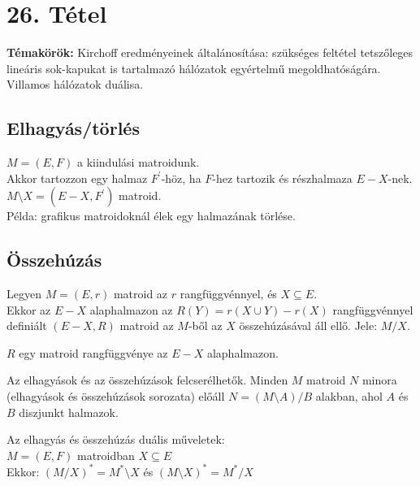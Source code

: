 
\setcounter{chapter}{26}
\chapter*{26. Tétel}

\textbf{Témakörök:} Kirchoff eredményeinek általánosítása: szükséges feltétel tetszőleges lineáris sok-kapukat is tartalmazó hálózatok egyértelmű megoldhatóságára. Villamos hálózatok duálisa.

\noindent\hrulefill

\section*{Elhagyás/törlés}
$M=(E,F)$ a kiindulási matroidunk.\\
Akkor tartozzon egy halmaz $F^{'}$-höz, ha $F$-hez tartozik és részhalmaza $E-X$-nek.\\
$M\setminus X=(E-X,F^{'})$ matroid.\\
Példa: grafikus matroidoknál élek egy halmazának törlése.

\section*{Összehúzás}
Legyen $M=(E,r)$ matroid az $r$ rangfüggvénnyel, és $X\subseteq E$.\\
Ekkor az $E-X$ alaphalmazon az $R(Y)=r(X\cup Y)-r(X)$ rangfüggvénnyel definiált $(E-X,R)$ matroid az $M$-ből az $X$ összehúzásával áll ellő. Jele: $M/X$.

\begin{lem}
$R$ egy matroid rangfüggvénye az $E-X$ alaphalmazon.
\end{lem}

\begin{theo}
Az elhagyások és az összehúzások felcserélhetők. Minden $M$ matroid $N$ minora (elhagyások és összehúzások sorozata) előáll $N=(M\setminus A)/B$ alakban, ahol $A$ és $B$ diszjunkt halmazok.
\end{theo}

\begin{theo}
Az elhagyás és összehúzás duális műveletek:\\
$M=(E,F)$ matroidban $X\subseteq E$\\
Ekkor: $(M/X)^{*}=M^{*}\setminus X$ és $(M\setminus X)^{*}=M^{*}/X$
\end{theo}


